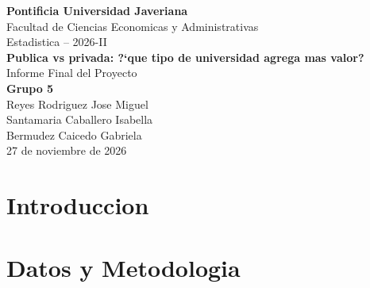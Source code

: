 \documentclass[11pt, a4paper]{article}
\begin{document}
\begin{center}
{\Large \textbf{Pontificia Universidad Javeriana}}\\[0.3cm]
Facultad de Ciencias Economicas y Administrativas\\[0.3cm]
Estadistica -- 2026-II\\[1cm]
{\LARGE \textbf{Publica vs privada: ?`que tipo de universidad agrega mas valor?}}\\[0.5cm]
{\large Informe Final del Proyecto}\\[1cm]
\textbf{Grupo 5}\\[0.3cm]
Reyes Rodriguez Jose Miguel\\
Santamaria Caballero Isabella\\
Bermudez Caicedo Gabriela\\[1cm]
27 de noviembre de 2026
\end{center}

\newpage
\tableofcontents
\newpage

\section{Introduccion}

\section{Datos y Metodologia}
\end{document}
